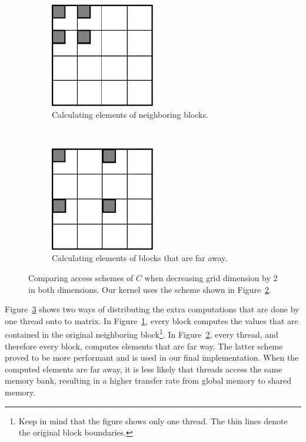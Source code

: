 \documentclass[12pt]{article}
\begin{document}
\begin{figure}[H]
        \centering
        \begin{subfigure}[b]{0.45\textwidth}
        		\centering
                \includegraphics[width=0.5\textwidth]{blocks_blocked.pdf}
                \caption{Calculating elements of neighboring blocks.}
                \label{fig:block_neighboring}
        \end{subfigure}%
        ~ %
        \begin{subfigure}[b]{0.45\textwidth}
        		\centering
                \includegraphics[width=0.5\textwidth]{blocks_distributed.pdf}
                \caption{Calculating elements of blocks that are far away.}
                \label{fig:block_far_away}
        \end{subfigure}
        \caption{Comparing access schemes of $C$ when decreasing grid dimension by 2 in both dimensions. Our kernel uses the scheme shown in Figure~\ref{fig:block_far_away}.}\label{fig:access_schemes}
\end{figure}

Figure~\ref{fig:access_schemes} shows two ways of distributing the extra computations that are done by one thread onto to matrix. In Figure~\ref{fig:block_neighboring}, every block computes the values that are contained in the original neighboring block\footnote{Keep in mind that the figure shows only one thread. The thin lines denote the original block boundaries.}. In Figure~\ref{fig:block_far_away}, every thread, and therefore every block, computes elements that are far way. The latter scheme proved to be more performant and is used in our final implementation.  When the computed elements are far away, it is less likely that threads access the same memory bank, resulting in a higher transfer rate from global memory to shared memory.
\end{document}
